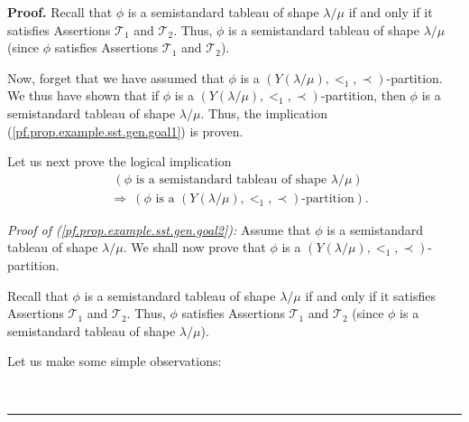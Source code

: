 \documentclass[numbers=enddot,12pt,final,onecolumn,notitlepage,abstracton]{scrartcl}
\theoremstyle{definition}
\newenvironment{proof}[1][Proof]{\noindent\textbf{#1.} }{\ \rule{0.5em}{0.5em}}
\newenvironment{verlong}{}{}
\begin{document}
\begin{verlong}
\begin{footnotesize}
\begin{proof}
Recall that $\phi$ is a semistandard tableau of shape $\lambda/\mu$ if and
only if it satisfies Assertions $\mathcal{T}_{1}$ and $\mathcal{T}_{2}$. Thus,
$\phi$ is a semistandard tableau of shape $\lambda/\mu$ (since $\phi$
satisfies Assertions $\mathcal{T}_{1}$ and $\mathcal{T}_{2}$).

Now, forget that we have assumed that $\phi$ is a $\left(  Y\left(
\lambda/\mu\right)  ,<_{1},\prec\right)  $-partition. We thus have shown that
if $\phi$ is a $\left(  Y\left(  \lambda/\mu\right)  ,<_{1},\prec\right)
$-partition, then $\phi$ is a semistandard tableau of shape $\lambda/\mu$.
Thus, the implication (\ref{pf.prop.example.sst.gen.goal1}) is proven.

Let us next prove the logical implication%
\begin{align}
&  \ \left(  \phi\text{ is a semistandard tableau of shape }\lambda/\mu\right)
\nonumber\\
&  \Longrightarrow\ \left(  \phi\text{ is a }\left(  Y\left(  \lambda
/\mu\right)  ,<_{1},\prec\right)  \text{-partition}\right)  .
\label{pf.prop.example.sst.gen.goal2}%
\end{align}


\textit{Proof of (\ref{pf.prop.example.sst.gen.goal2}):} Assume that $\phi$ is
a semistandard tableau of shape $\lambda/\mu$. We shall now prove that $\phi$
is a $\left(  Y\left(  \lambda/\mu\right)  ,<_{1},\prec\right)  $-partition.

Recall that $\phi$ is a semistandard tableau of shape $\lambda/\mu$ if and
only if it satisfies Assertions $\mathcal{T}_{1}$ and $\mathcal{T}_{2}$. Thus,
$\phi$ satisfies Assertions $\mathcal{T}_{1}$ and $\mathcal{T}_{2}$ (since
$\phi$ is a semistandard tableau of shape $\lambda/\mu$).

Let us make some simple observations:


\end{proof}
\end{footnotesize}
\end{verlong}
\end{document}
